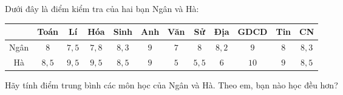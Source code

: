 \begin{ex}
Dưới đây là điểm kiểm tra của hai bạn Ngân và Hà:
\begin{center}
\begin{tabular}{|c|c|c|c|c|c|c|c|c|c|c|c|}\hline
 & Toán & Lí & Hóa & Sinh & Anh & Văn & Sử & Địa & GDCD & Tin & CN\\\hline
Ngân & $8$ & $7{,}5$ & $7{,}8$ & $8{,}3$ & $9$ & $7$ & $8$ & $8{,}2$ & $9$ & $8$ & $8{,}3$\\\hline
Hà & $8{,}5$ & $9{,}5$ & $9{,}5$ & $8{,}5$ & $9$ & $5$ & $5{,}5$ & $6$ & $10$ & $9$ & $8{,}5$\\\hline
\end{tabular}
\end{center}
Hãy tính điểm trung bình các môn học của Ngân và Hà. Theo em, bạn nào học đều hơn?
\end{ex}
